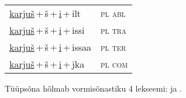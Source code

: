 \begin{minipage}{\textwidth}
\begin{sideways}
\begin{tabular}{l l}
\underline{karjuš}\,+\,š\,+\,\underline{i}\,+\,ilt & \textsc{ pl abl } \\
\underline{karjuš}\,+\,š\,+\,\underline{i}\,+\,issi & \textsc{ pl tra } \\
\underline{karjuš}\,+\,š\,+\,\underline{i}\,+\,issaa & \textsc{ pl ter } \\
\underline{karjuš}\,+\,š\,+\,\underline{i}\,+\,jka & \textsc{ pl com } \\
\end{tabular}
\end{sideways}
\label{tab:tüüpsõnamall-karjušši}

\end{minipage}

 
\vspace{1em}
\noindent Tüüpsõna hõlmab vormisõnastiku 4 lekseemi:  ja .
